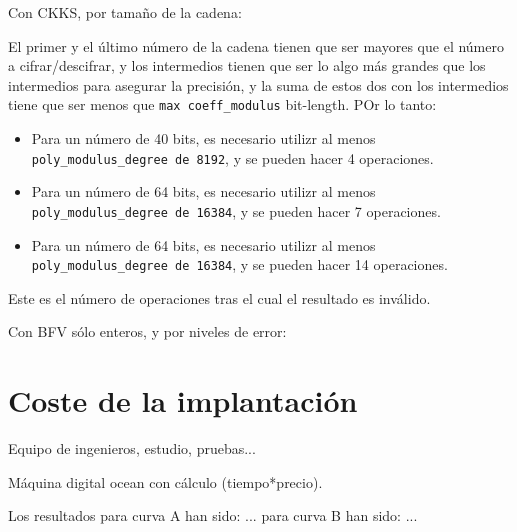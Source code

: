 Con CKKS, por tamaño de la cadena:

El primer y el último número de la cadena tienen que ser mayores que el número a cifrar/descifrar, y los intermedios tienen que ser lo algo más grandes  que los intermedios para asegurar la precisión, y la suma de estos dos con los intermedios tiene que ser menos que  \verb|max coeff_modulus| bit-length. POr lo tanto:

\begin{itemize}
    \item Para un número de 40 bits, es necesario utilizr al menos  \verb|poly_modulus_degree de 8192|, y se pueden hacer 4 operaciones.
    \item Para un número de 64 bits, es necesario utilizr al menos  \verb|poly_modulus_degree de 16384|, y se pueden hacer 7 operaciones.
    \item Para un número de 64 bits, es necesario utilizr al menos \verb|poly_modulus_degree de 16384|, y se pueden hacer 14 operaciones.
\end{itemize}

Este es el número de operaciones tras el cual el resultado es inválido.

Con BFV sólo enteros, y por niveles de error:

\section{Coste de la implantación}

Equipo de ingenieros, estudio, pruebas...

Máquina digital ocean con cálculo (tiempo*precio).

Los resultados para curva A han sido: ...
para curva B han sido: ...